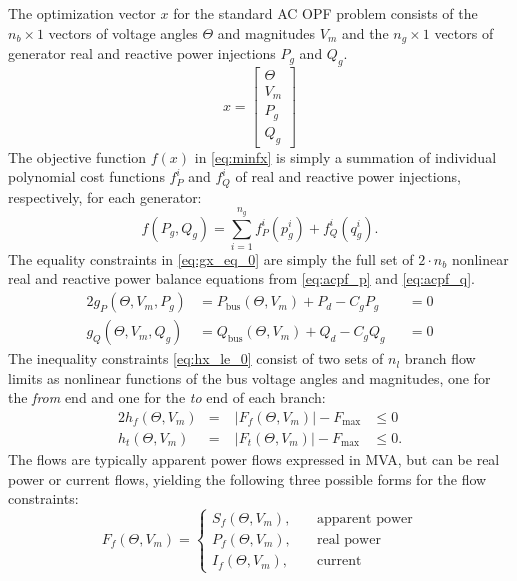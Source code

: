 \documentclass[12pt]{article}
\numberwithin{equation}{section}
\numberwithin{table}{section}
\numberwithin{figure}{section}
\begin{document}
The optimization vector $x$ for the standard AC OPF problem consists of the $n_b \times 1$ vectors of voltage angles $\Theta$ and magnitudes $V_m$ and the $n_g \times 1$ vectors of generator real and reactive power injections $P_g$ and $Q_g$.
\begin{equation}
x = \left[\begin{array}{c}\Theta \\ V_m \\ P_g \\ Q_g \end{array}\right]
\end{equation}
The objective function $f(x)$ in \eqref{eq:minfx} is simply a summation of individual polynomial cost functions $f_P^i$ and $f_Q^i$ of real and reactive power injections, respectively, for each generator:
\begin{equation}
f(P_g, Q_g) = \sum_{i=1}^{n_g} f_P^i(p_g^i) +  f_Q^i(q_g^i).
\end{equation}
The equality constraints in \eqref{eq:gx_eq_0} are simply the full set of $2 \cdot n_b$ nonlinear real and reactive power balance equations from \eqref{eq:acpf_p} and \eqref{eq:acpf_q}.
\begin{alignat}{2}
g_P(\Theta, V_m, P_g) &= P_\mathrm{bus}(\Theta, V_m) + P_d - C_g P_g &&= 0 \label{eq:polar_pwrbal_p} \\
g_Q(\Theta, V_m, Q_g) &= Q_\mathrm{bus}(\Theta, V_m) + Q_d - C_g Q_g &&= 0 \label{eq:polar_pwrbal_q}
\end{alignat}
The inequality constraints \eqref{eq:hx_le_0} consist of two sets of $n_l$ branch flow limits as nonlinear functions of the bus voltage angles and magnitudes, one for the \emph{from} end and one for the \emph{to} end of each branch:
\begin{alignat}{2}
h_f(\Theta, V_m) &=\;& \left| F_f(\Theta, V_m) \right| - F_\mathrm{max} &\le 0 \label{eq:acopf_ieqf} \\
h_t(\Theta, V_m) &= & \left| F_t(\Theta, V_m) \right| - F_\mathrm{max} &\le 0. \label{eq:acopf_ieqt}
\end{alignat}
The flows are typically apparent power flows expressed in MVA, but can be real power or current flows, yielding the following three possible forms for the flow constraints:
\begin{equation}
F_f(\Theta, V_m) = \left\{
\begin{aligned}
S_f(\Theta, V_m), \quad & \text{apparent power} \\
P_f(\Theta, V_m), \quad & \text{real power} \\
I_f(\Theta, V_m), \quad & \text{current}
\label{eq:flowlimoptions}
\end{aligned}
\right.
\end{equation}
\end{document}
